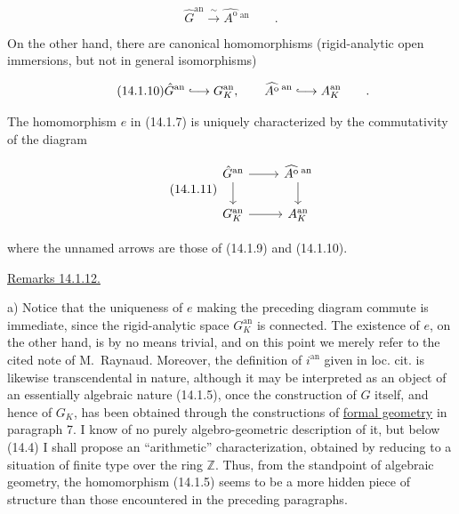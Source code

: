 \begin{equation}\tag{14.1.9}
 \hat G^{\mathrm{an}}\xrightarrow{\ \sim\ }
 \widehat{A^{\mathrm o}}\,{}^{\mathrm{an}}
 \qquad .
\end{equation}

\noindent
On the other hand, there are canonical homomorphisms (rigid-analytic
open immersions, but not in general isomorphisms)

\begin{equation}\tag{14.1.10}
 \hat G^{\mathrm{an}}\lhook\joinrel\longrightarrow G_K^{\mathrm{an}},
 \qquad
 \widehat{A^{\mathrm o}}\,{}^{\mathrm{an}}
 \lhook\joinrel\longrightarrow A_K^{\mathrm{an}}
 \qquad .
\end{equation}

\noindent
The homomorphism $e$ in (14.1.7) is uniquely characterized by the
commutativity of the diagram

\begin{equation}\tag{14.1.11}
\begin{tikzcd}
 \hat G^{\mathrm{an}} \arrow[r] \arrow[d]
   & \widehat{A^{\mathrm o}}\,{}^{\mathrm{an}} \arrow[d] \\
 G_K^{\mathrm{an}} \arrow[r] & A_K^{\mathrm{an}}
\end{tikzcd}
\end{equation}

\noindent
where the unnamed arrows are those of (14.1.9) and (14.1.10).

\medskip
\noindent
\underline{Remarks 14.1.12.}

\smallskip
\noindent
a) Notice that the uniqueness of $e$ making the preceding diagram
commute is immediate, since the rigid-analytic space
$G_K^{\mathrm{an}}$ is connected.  The existence of $e$, on the other
hand, is by no means trivial, and on this point we merely refer to the
cited note of M.~Raynaud.  Moreover, the definition of
$i^{\mathrm{an}}$ given in loc. cit. is likewise transcendental in
nature, although it may be interpreted as an object of an essentially
algebraic nature (14.1.5), once the construction of $G$ itself, and
hence of $G_K$, has been obtained through the constructions of
\underline{formal geometry} in paragraph 7.  I know of no purely
algebro-geometric description of it, but below (14.4) I shall propose
an ``arithmetic'' characterization, obtained by reducing to a situation
of finite type over the ring $\mathbb Z$.  Thus, from the standpoint of
algebraic geometry, the homomorphism (14.1.5) seems to be a more hidden
piece of structure than those encountered in the preceding paragraphs.

